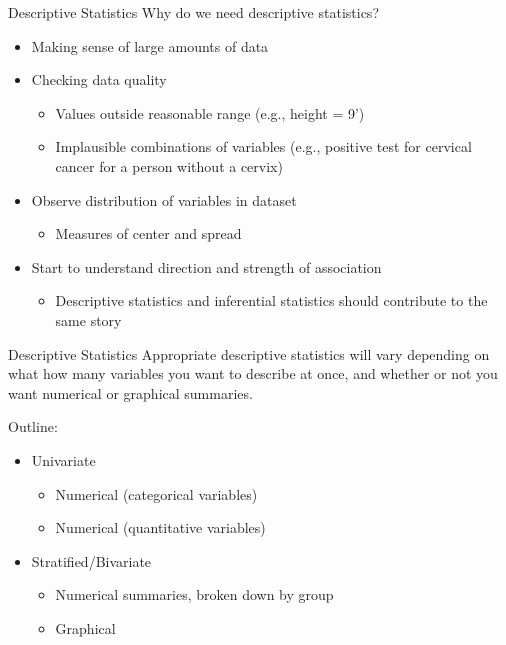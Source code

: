 \documentclass[10pt,t]{beamer}
\begin{document}
\begin{frame}{Descriptive Statistics}
Why do we need descriptive statistics?

\vspace{0.3cm}

\begin{itemize}
	\item Making sense of large amounts of data
	\medskip
	\item Checking data quality
	\medskip
	\begin{itemize}
		\item Values outside reasonable range (e.g., height = 9')
		\item Implausible combinations of variables (e.g., positive test for cervical cancer for a person without a cervix)
	\end{itemize}
\medskip

	\item Observe distribution of variables in dataset
	\medskip
	\begin{itemize}
		\item Measures of center and spread
	\end{itemize}
\medskip

	\item Start to understand direction and strength of association
	\medskip
	\begin{itemize}
		\item Descriptive statistics and inferential statistics should contribute to the same story
	\end{itemize}
\end{itemize}

\end{frame}

\begin{frame}{Descriptive Statistics}
Appropriate descriptive statistics will vary depending on what how many variables you want to describe at once, and whether or not you want numerical or graphical summaries.

\vspace{0.3cm}

Outline:
\medskip

\begin{itemize}
	\item Univariate
	\smallskip
	\begin{itemize}
		\item Numerical (categorical variables)
		\smallskip
		\item Numerical (quantitative variables)
	\end{itemize}
\medskip

	\item Stratified/Bivariate
	\begin{itemize}
		\item Numerical summaries, broken down by group
		\smallskip
		\item Graphical
	\end{itemize}
\end{itemize}
\end{frame}
\end{document}

